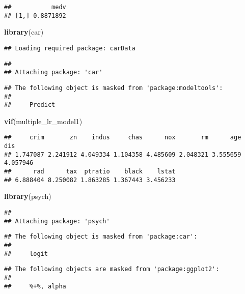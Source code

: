 \documentclass[
]{article}
\newenvironment{Shaded}{\begin{snugshade}}{\end{snugshade}}
\newcommand{\KeywordTok}[1]{\textcolor[rgb]{0.13,0.29,0.53}{\textbf{#1}}}
\newcommand{\NormalTok}[1]{#1}
\begin{document}
\begin{verbatim}
##           medv
## [1,] 0.8871892
\end{verbatim}

\begin{Shaded}
\begin{Highlighting}[]
\KeywordTok{library}\NormalTok{(car)}
\end{Highlighting}
\end{Shaded}

\begin{verbatim}
## Loading required package: carData
\end{verbatim}

\begin{verbatim}
## 
## Attaching package: 'car'
\end{verbatim}

\begin{verbatim}
## The following object is masked from 'package:modeltools':
## 
##     Predict
\end{verbatim}

\begin{Shaded}
\begin{Highlighting}[]
\KeywordTok{vif}\NormalTok{(multiple_lr_model1)}
\end{Highlighting}
\end{Shaded}

\begin{verbatim}
##     crim       zn    indus     chas      nox       rm      age      dis 
## 1.747087 2.241912 4.049334 1.104358 4.485609 2.048321 3.555659 4.057946 
##      rad      tax  ptratio    black    lstat 
## 6.888404 8.250082 1.863285 1.367443 3.456233
\end{verbatim}

\begin{Shaded}
\begin{Highlighting}[]
\KeywordTok{library}\NormalTok{(psych)}
\end{Highlighting}
\end{Shaded}

\begin{verbatim}
## 
## Attaching package: 'psych'
\end{verbatim}

\begin{verbatim}
## The following object is masked from 'package:car':
## 
##     logit
\end{verbatim}

\begin{verbatim}
## The following objects are masked from 'package:ggplot2':
## 
##     %+%, alpha
\end{verbatim}
\end{document}
